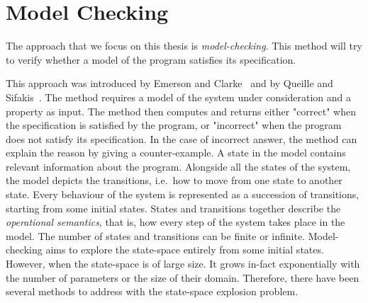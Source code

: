 \chapter{Model Checking}
\label{section:model:checking}
%
%
%
The approach that we focus on this thesis is
\emph{model-checking}.
%
%
This method will try to verify whether a model of the program
satisfies its specification.
%
%
 
This approach was introduced by Emerson and Clarke~\cite{CE82} and by Queille and Sifakis~\cite{QS82}. The method requires a model of the system under
consideration and a property as input. The method then computes and returns either "correct" when the specification is satisfied by the program, or "incorrect" when the program does not satisfy its specification. In the case of incorrect answer, the method can explain the reason by giving a counter-example. A state in the model contains relevant information about the program. Alongside all the states of the system, the model depicts the
transitions, i.e.\ how to move from one state to another state. Every behaviour of the system is represented as a succession of transitions, starting from some initial states. States and transitions together describe the \emph{operational
  semantics}, that is, how every step of the system takes place in the model. The number of states and transitions can be finite or infinite. Model-checking aims to explore the state-space entirely from some initial states. However, when the state-space is of large size. It grows in-fact
exponentially with the number of parameters or the size of their
domain. Therefore, there have been several methods to address with the
state-space explosion problem.
                   
